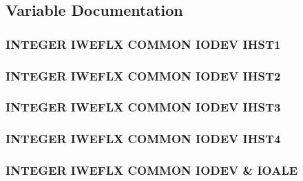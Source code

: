 \subsection{Variable Documentation}
\hypertarget{io_8com_a55a72b315d622d8470187d5b804a26fe}{
\subsubsection[{I\-H\-S\-T1}]{\setlength{\rightskip}{0pt plus 5cm}I\-N\-T\-E\-G\-E\-R I\-W\-E\-F\-L\-X C\-O\-M\-M\-O\-N I\-O\-D\-E\-V I\-H\-S\-T1}}\label{io_8com_a55a72b315d622d8470187d5b804a26fe}
\hypertarget{io_8com_ab66ef6ade746503f5f307b652925713c}{
\subsubsection[{I\-H\-S\-T2}]{\setlength{\rightskip}{0pt plus 5cm}I\-N\-T\-E\-G\-E\-R I\-W\-E\-F\-L\-X C\-O\-M\-M\-O\-N I\-O\-D\-E\-V I\-H\-S\-T2}}\label{io_8com_ab66ef6ade746503f5f307b652925713c}
\hypertarget{io_8com_a57fdce59558d18766a22994722ef0686}{
\subsubsection[{I\-H\-S\-T3}]{\setlength{\rightskip}{0pt plus 5cm}I\-N\-T\-E\-G\-E\-R I\-W\-E\-F\-L\-X C\-O\-M\-M\-O\-N I\-O\-D\-E\-V I\-H\-S\-T3}}\label{io_8com_a57fdce59558d18766a22994722ef0686}
\hypertarget{io_8com_a327b93c1358b3026bb2b496c88b06de9}{
\subsubsection[{I\-H\-S\-T4}]{\setlength{\rightskip}{0pt plus 5cm}I\-N\-T\-E\-G\-E\-R I\-W\-E\-F\-L\-X C\-O\-M\-M\-O\-N I\-O\-D\-E\-V I\-H\-S\-T4}}\label{io_8com_a327b93c1358b3026bb2b496c88b06de9}
\hypertarget{io_8com_af3a420e98cd1488f16cf7fc91a9cc47a}{
\subsubsection[{I\-O\-A\-L\-E}]{\setlength{\rightskip}{0pt plus 5cm}I\-N\-T\-E\-G\-E\-R I\-W\-E\-F\-L\-X C\-O\-M\-M\-O\-N I\-O\-D\-E\-V \& I\-O\-A\-L\-E}}\label{io_8com_af3a420e98cd1488f16cf7fc91a9cc47a}
